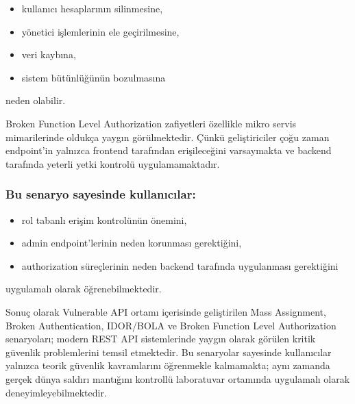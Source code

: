 \begin{itemize}[leftmargin=*]
    \item kullanıcı hesaplarının silinmesine,
    \item yönetici işlemlerinin ele geçirilmesine,
    \item veri kaybına,
    \item sistem bütünlüğünün bozulmasına
\end{itemize}

neden olabilir.

Broken Function Level Authorization zafiyetleri özellikle mikro servis mimarilerinde oldukça yaygın görülmektedir. Çünkü geliştiriciler çoğu zaman endpoint’in yalnızca frontend tarafından erişileceğini varsaymakta ve backend tarafında yeterli yetki kontrolü uygulamamaktadır.

\subsubsection{Bu senaryo sayesinde kullanıcılar:}

\begin{itemize}[leftmargin=*]
    \item rol tabanlı erişim kontrolünün önemini,
    \item admin endpoint’lerinin neden korunması gerektiğini,
    \item authorization süreçlerinin neden backend tarafında uygulanması gerektiğini
\end{itemize}

uygulamalı olarak öğrenebilmektedir.

Sonuç olarak Vulnerable API ortamı içerisinde geliştirilen Mass Assignment, Broken Authentication, IDOR/BOLA ve Broken Function Level Authorization senaryoları; modern REST API sistemlerinde yaygın olarak görülen kritik güvenlik problemlerini temsil etmektedir. Bu senaryolar sayesinde kullanıcılar yalnızca teorik güvenlik kavramlarını öğrenmekle kalmamakta; aynı zamanda gerçek dünya saldırı mantığını kontrollü laboratuvar ortamında uygulamalı olarak deneyimleyebilmektedir.


\clearpage
